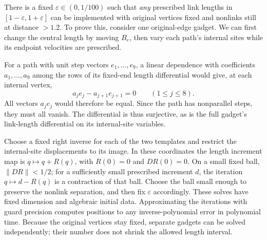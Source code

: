There is a fixed \(\varepsilon\in(0,1/100)\) such that \emph{any}
prescribed link lengths in \([1-\varepsilon,1+\varepsilon]\) can be
implemented with original vertices fixed and nonlinks still at distance
\(>1.2\). To prove this, consider one original-edge gadget. We can first
change the central length by moving \(B_e\), then vary each path's
internal sites while its endpoint velocities are prescribed.

For a path with unit step vectors \(e_1,\ldots,e_9\), a linear
dependence with coefficients \(a_1,\ldots,a_9\) among the rows of its
fixed-end length differential would give, at each internal vertex,
\[
                 a_j e_j-a_{j+1}e_{j+1}=0
                    \qquad (1\le j\le8).
\]
All vectors \(a_j e_j\) would therefore be equal. Since the path has
nonparallel steps, they must all vanish. The differential is thus
surjective, as is the full gadget's link-length differential on its
internal-site variables.

Choose a fixed right inverse for each of the two templates and restrict
the internal-site displacements to its image. In these coordinates the
length increment map is \(q\mapsto q+R(q)\), with \(R(0)=0\) and
\(DR(0)=0\). On a small fixed ball, \(\|DR\|<1/2\); for a
sufficiently small prescribed increment \(d\), the iteration
\(q\mapsto d-R(q)\) is a contraction of that ball. Choose the ball
small enough to preserve the nonlink separation, and then fix
\(\varepsilon\) accordingly. These solves have fixed dimension and
algebraic initial data. Approximating the iterations with guard precision
computes positions to any inverse-polynomial error in polynomial time.
Because the original vertices stay fixed, separate gadgets can be solved
independently; their number does not shrink the allowed length interval.
